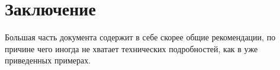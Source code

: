 \documentclass{article}
\begin{document}
\section{Заключение}
Большая часть документа содержит в себе скорее общие рекомендации, по причине чего иногда не хватает технических подробностей, как в уже приведенных примерах.
\end{document}
